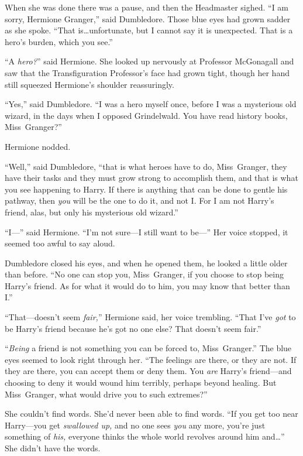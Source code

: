 When she was done there was a pause, and then the Headmaster sighed. “I am sorry, Hermione Granger,” said Dumbledore. Those blue eyes had grown sadder as she spoke. “That is…unfortunate, but I cannot say it is unexpected. That is a hero’s burden, which you see.”

“A \emph{hero?}” said Hermione. She looked up nervously at Professor McGonagall and saw that the Transfiguration Professor’s face had grown tight, though her hand still squeezed Hermione’s shoulder reassuringly.

“Yes,” said Dumbledore. “I was a hero myself once, before I was a mysterious old wizard, in the days when I opposed Grindelwald. You have read history books, Miss~Granger?”

Hermione nodded.

“Well,” said Dumbledore, “that is what heroes have to do, Miss~Granger, they have their tasks and they must grow strong to accomplish them, and that is what you see happening to Harry. If there is anything that can be done to gentle his pathway, then \emph{you} will be the one to do it, and not I\@. For I am not Harry’s friend, alas, but only his mysterious old wizard.”

“I—” said Hermione. “I’m not sure—I still want to be—” Her voice stopped, it seemed too awful to say aloud.

Dumbledore closed his eyes, and when he opened them, he looked a little older than before. “No one can stop you, Miss~Granger, if you choose to stop being Harry’s friend. As for what it would do to him, you may know that better than I.”

“That—doesn’t seem \emph{fair,}” Hermione said, her voice trembling. “That I’ve \emph{got} to be Harry’s friend because he’s got no one else? That doesn’t seem fair.”

“\emph{Being} a friend is not something you can be forced to, Miss~Granger.” The blue eyes seemed to look right through her. “The feelings are there, or they are not. If they are there, you can accept them or deny them. You \emph{are} Harry’s friend—and choosing to deny it would wound him terribly, perhaps beyond healing. But Miss~Granger, what would drive you to such extremes?”

She couldn’t find words. She’d never been able to find words. “If you get too near Harry—you get \emph{swallowed up,} and no one sees \emph{you} any more, you’re just something of \emph{his,} everyone thinks the whole world revolves around him and…” She didn’t have the words.

